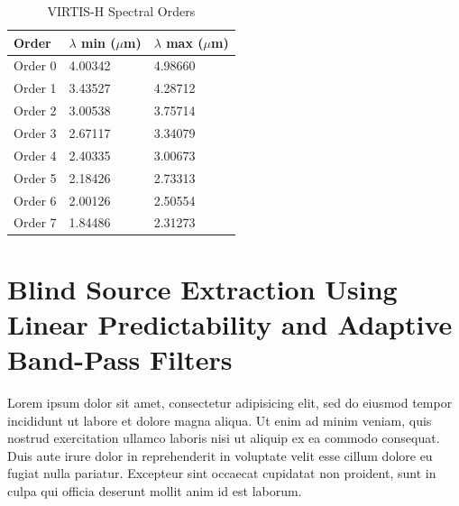 \documentclass[5p]{elsarticle}
\begin{document}
\begin{table}[b] \centering \caption{VIRTIS-H Spectral Orders}
  \begin{tabular}{|l|l|l|}
    \hline 
    \rowcolor[gray]{.7} Order & $\lambda$ min ($\mu$m) & $\lambda$ max ($\mu$m) \\ \hline
    Order 0 & 4.00342 & 4.98660 \\ \hline 
    Order 1 & 3.43527 & 4.28712 \\ \hline
    Order 2 & 3.00538 & 3.75714 \\ \hline
    Order 3 & 2.67117 & 3.34079 \\ \hline
    Order 4 & 2.40335 & 3.00673 \\ \hline
    Order 5 & 2.18426 & 2.73313 \\ \hline
    Order 6 & 2.00126 & 2.50554 \\ \hline
    Order 7 & 1.84486 & 2.31273 \\ \hline
  \end{tabular}
  \label{ordertable}
\end{table}


\section{Blind Source Extraction Using Linear Predictability and Adaptive Band-Pass Filters}

Lorem ipsum dolor sit amet, consectetur adipisicing elit, sed do eiusmod tempor incididunt ut labore et dolore magna aliqua. Ut enim ad minim veniam, quis nostrud exercitation ullamco laboris nisi ut aliquip ex ea commodo consequat. Duis aute irure dolor in reprehenderit in voluptate velit esse cillum dolore eu fugiat nulla pariatur. Excepteur sint occaecat cupidatat non proident, sunt in culpa qui officia deserunt mollit anim id est laborum.
\end{document}
